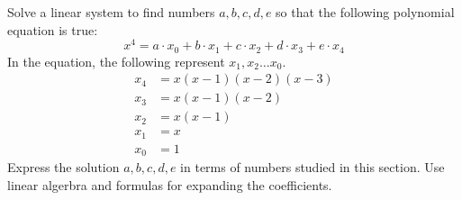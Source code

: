 \documentclass{article}
\begin{document}
\setcounter{problem}{16}
\begin{problem}
Solve a linear system to find numbers $a, b, c, d, e$ so that the following polynomial equation is true:
\begin{equation*}
    x^4 = a \cdot x_0 + b \cdot x_1 + c \cdot x_2 + d \cdot x_3 + e \cdot x_4
\end{equation*}
In the equation, the following represent $x_1, x_2 \dots x_0$.
\begin{align*}
    x_4 & = x(x-1)(x-2)(x-3) \\
    x_3 & = x(x-1)(x-2) \\
    x_2 & = x(x-1) \\
    x_1 & = x \\
    x_0 & = 1
\end{align*}
Express the solution $a,b,c,d,e$ in terms of numbers studied in this section. Use linear algerbra and formulas for expanding the coefficients.
\end{problem}
\end{document}
